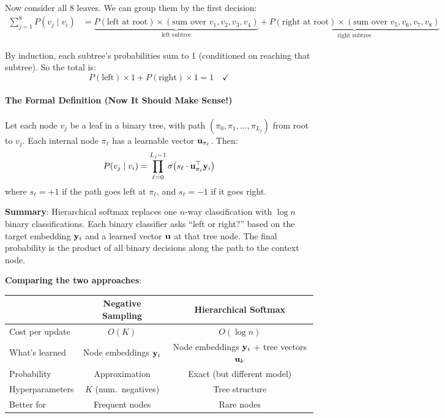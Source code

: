 \begin{notechapter}
Now consider all 8 leaves. We can group them by the first decision:
\begin{align*}
\sum_{j=1}^{8} P(v_j \mid v_i) &= \underbrace{P(\text{left at root}) \times (\text{sum over } v_1, v_2, v_3, v_4)}_{\text{left subtree}} + \underbrace{P(\text{right at root}) \times (\text{sum over } v_5, v_6, v_7, v_8)}_{\text{right subtree}}
\end{align*}

By induction, each subtree's probabilities sum to 1 (conditioned on reaching that subtree). So the total is:
\[
P(\text{left}) \times 1 + P(\text{right}) \times 1 = 1 \quad \checkmark
\]

\paragraph{The Formal Definition (Now It Should Make Sense!)}

\begin{definition}
Let each node $v_j$ be a leaf in a binary tree, with path $(\pi_0, \pi_1, \ldots, \pi_{L_j})$ from root to $v_j$. Each internal node $\pi_\ell$ has a learnable vector $\mathbf{u}_{\pi_\ell}$. Then:
\[
P(v_j \mid v_i) = \prod_{\ell=0}^{L_j - 1} \sigma\bigl(s_\ell \cdot \mathbf{u}_{\pi_\ell}^\top \mathbf{y}_i\bigr)
\]
where $s_\ell = +1$ if the path goes left at $\pi_\ell$, and $s_\ell = -1$ if it goes right.
\end{definition}

\begin{intuition}
\textbf{Summary}: Hierarchical softmax replaces one $n$-way classification with $\log n$ binary classifications. Each binary classifier asks ``left or right?'' based on the target embedding $\mathbf{y}_i$ and a learned vector $\mathbf{u}$ at that tree node. The final probability is the product of all binary decisions along the path to the context node.
\end{intuition}

\begin{keyinsight}
\textbf{Comparing the two approaches}:

\begin{center}
\begin{tabular}{lcc}
\toprule
 & \textbf{Negative Sampling} & \textbf{Hierarchical Softmax} \\
\midrule
Cost per update & $O(K)$ & $O(\log n)$ \\
What's learned & Node embeddings $\mathbf{y}_i$ & Node embeddings $\mathbf{y}_i$ + tree vectors $\mathbf{u}_k$ \\
Probability & Approximation & Exact (but different model) \\
Hyperparameters & $K$ (num.\ negatives) & Tree structure \\
Better for & Frequent nodes & Rare nodes \\
\bottomrule
\end{tabular}
\end{center}


\end{keyinsight}
\end{notechapter}
